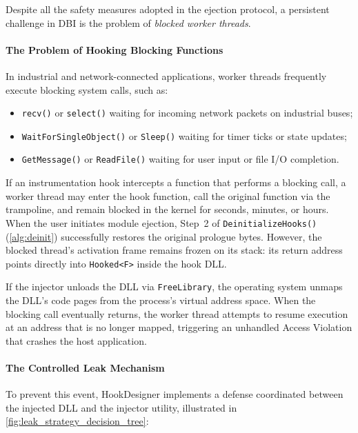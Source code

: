 Despite all the safety measures adopted in the ejection protocol, a persistent challenge in \ac{DBI} is the problem of \emph{blocked worker threads}.

\paragraph{The Problem of Hooking Blocking Functions}

In industrial and network-connected applications, worker threads frequently execute blocking system calls, such as:
\begin{itemize}
	\item \texttt{recv()} or \texttt{select()} waiting for incoming network packets on industrial buses;
	\item \texttt{WaitForSingleObject()} or \texttt{Sleep()} waiting for timer ticks or state updates;
	\item \texttt{GetMessage()} or \texttt{ReadFile()} waiting for user input or file I/O completion.
\end{itemize}

If an instrumentation hook intercepts a function that performs a blocking call, a worker thread may enter the hook function, call the original function via the trampoline, and remain blocked in the kernel for seconds, minutes, or hours.
When the user initiates module ejection, Step~2 of \texttt{DeinitializeHooks()} (\cref{alg:deinit}) successfully restores the original prologue bytes.
However, the blocked thread's activation frame remains frozen on its stack: its return address points directly into \texttt{Hooked<F>} inside the hook \ac{DLL}.

If the injector unloads the \ac{DLL} via \texttt{FreeLibrary}, the operating system unmaps the \ac{DLL}'s code pages from the process's virtual address space.
When the blocking call eventually returns, the worker thread attempts to resume execution at an address that is no longer mapped, triggering an unhandled Access Violation that crashes the host application.

\paragraph{The Controlled Leak Mechanism}

To prevent this event, HookDesigner implements a defense coordinated between the injected \ac{DLL} and the injector utility, illustrated in \cref{fig:leak_strategy_decision_tree}:

